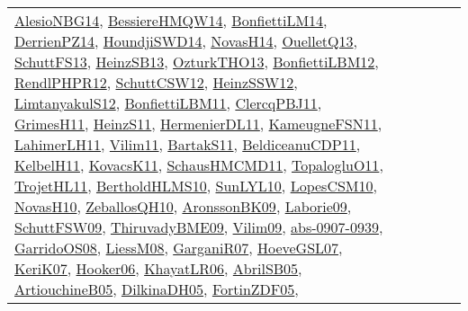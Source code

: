 {\begin{longtable}{lp{3cm}>{\raggedright}p{6cm}>{\raggedright}p{6cm}p{8cm}}
\href{papers/AlesioNBG14.pdf}{AlesioNBG14}\cite{AlesioNBG14}, \href{papers/BessiereHMQW14.pdf}{BessiereHMQW14}\cite{BessiereHMQW14}, \href{papers/BonfiettiLM14.pdf}{BonfiettiLM14}\cite{BonfiettiLM14}, \href{papers/DerrienPZ14.pdf}{DerrienPZ14}\cite{DerrienPZ14}, \href{papers/HoundjiSWD14.pdf}{HoundjiSWD14}\cite{HoundjiSWD14}, \href{articles/NovasH14.pdf}{NovasH14}\cite{NovasH14}, \href{papers/OuelletQ13.pdf}{OuelletQ13}\cite{OuelletQ13}, \href{papers/SchuttFS13.pdf}{SchuttFS13}\cite{SchuttFS13}, \href{articles/HeinzSB13.pdf}{HeinzSB13}\cite{HeinzSB13}, \href{articles/OzturkTHO13.pdf}{OzturkTHO13}\cite{OzturkTHO13}, \href{papers/BonfiettiLBM12.pdf}{BonfiettiLBM12}\cite{BonfiettiLBM12}, \href{papers/RendlPHPR12.pdf}{RendlPHPR12}\cite{RendlPHPR12}, \href{papers/SchuttCSW12.pdf}{SchuttCSW12}\cite{SchuttCSW12}, \href{articles/HeinzSSW12.pdf}{HeinzSSW12}\cite{HeinzSSW12}, \href{articles/LimtanyakulS12.pdf}{LimtanyakulS12}\cite{LimtanyakulS12}, \href{papers/BonfiettiLBM11.pdf}{BonfiettiLBM11}\cite{BonfiettiLBM11}, \href{papers/ClercqPBJ11.pdf}{ClercqPBJ11}\cite{ClercqPBJ11}, \href{papers/GrimesH11.pdf}{GrimesH11}\cite{GrimesH11}, \href{papers/HeinzS11.pdf}{HeinzS11}\cite{HeinzS11}, \href{papers/HermenierDL11.pdf}{HermenierDL11}\cite{HermenierDL11}, \href{papers/KameugneFSN11.pdf}{KameugneFSN11}\cite{KameugneFSN11}, \href{papers/LahimerLH11.pdf}{LahimerLH11}\cite{LahimerLH11}, \href{papers/Vilim11.pdf}{Vilim11}\cite{Vilim11}, \href{articles/BartakS11.pdf}{BartakS11}\cite{BartakS11}, \href{articles/BeldiceanuCDP11.pdf}{BeldiceanuCDP11}\cite{BeldiceanuCDP11}, \href{articles/KelbelH11.pdf}{KelbelH11}\cite{KelbelH11}, \href{articles/KovacsK11.pdf}{KovacsK11}\cite{KovacsK11}, \href{articles/SchausHMCMD11.pdf}{SchausHMCMD11}\cite{SchausHMCMD11}, \href{articles/TopalogluO11.pdf}{TopalogluO11}\cite{TopalogluO11}, \href{articles/TrojetHL11.pdf}{TrojetHL11}\cite{TrojetHL11}, \href{papers/BertholdHLMS10.pdf}{BertholdHLMS10}\cite{BertholdHLMS10}, \href{papers/SunLYL10.pdf}{SunLYL10}\cite{SunLYL10}, \href{articles/LopesCSM10.pdf}{LopesCSM10}\cite{LopesCSM10}, \href{articles/NovasH10.pdf}{NovasH10}\cite{NovasH10}, \href{articles/ZeballosQH10.pdf}{ZeballosQH10}\cite{ZeballosQH10}, \href{papers/AronssonBK09.pdf}{AronssonBK09}\cite{AronssonBK09}, \href{papers/Laborie09.pdf}{Laborie09}\cite{Laborie09}, \href{papers/SchuttFSW09.pdf}{SchuttFSW09}\cite{SchuttFSW09}, \href{papers/ThiruvadyBME09.pdf}{ThiruvadyBME09}\cite{ThiruvadyBME09}, \href{papers/Vilim09.pdf}{Vilim09}\cite{Vilim09}, \href{articles/abs-0907-0939.pdf}{abs-0907-0939}\cite{abs-0907-0939}, \href{articles/GarridoOS08.pdf}{GarridoOS08}\cite{GarridoOS08}, \href{articles/LiessM08.pdf}{LiessM08}\cite{LiessM08}, \href{papers/GarganiR07.pdf}{GarganiR07}\cite{GarganiR07}, \href{papers/HoeveGSL07.pdf}{HoeveGSL07}\cite{HoeveGSL07}, \href{papers/KeriK07.pdf}{KeriK07}\cite{KeriK07}, \href{articles/Hooker06.pdf}{Hooker06}\cite{Hooker06}, \href{articles/KhayatLR06.pdf}{KhayatLR06}\cite{KhayatLR06}, \href{papers/AbrilSB05.pdf}{AbrilSB05}\cite{AbrilSB05}, \href{papers/ArtiouchineB05.pdf}{ArtiouchineB05}\cite{ArtiouchineB05}, \href{papers/DilkinaDH05.pdf}{DilkinaDH05}\cite{DilkinaDH05}, \href{papers/FortinZDF05.pdf}{FortinZDF05}\cite{FortinZDF05}, 
\end{longtable}}
